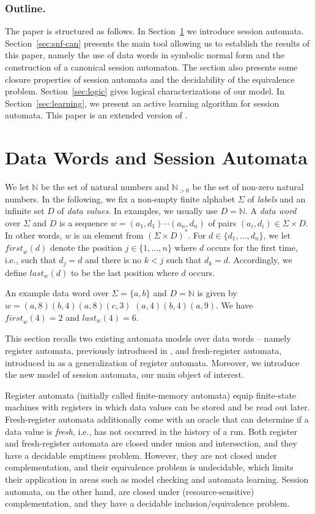 \documentclass{LMCS}
\def\N{\ensuremath{\mathbb N}\xspace}
\def\Nz{\ensuremath{\N_{{}>0}}\xspace}
\newcommand{\Data}{D}
\newcommand{\firstocc}[1]{\mathit{first}_{#1}}
\newcommand{\lastocc}[1]{\mathit{last}_{#1}}
\begin{document}
\subsubsection*{Outline.}
The paper is structured as follows. In Section~\ref{sec:data} we
introduce session automata. Section~\ref{sec:snf-can} presents the
main tool allowing us to establish the results of this paper, namely
the use of data words in symbolic normal form and the construction of
a canonical session automaton. The section also presents some closure
properties of session automata and the decidability of the equivalence
problem. Section~\ref{sec:logic} gives logical characterizations of
our model.  In Section~\ref{sec:learning}, we present an active
learning algorithm for session automata. This paper is an extended
version of \cite{BHLM-dlt2013}.


\section{Data Words and Session Automata}\label{sec:data}

We let $\N$ be the set of natural numbers and $\Nz$ be the set of
non-zero natural numbers. In the following, we fix a non-empty finite
alphabet $\Sigma$ of \emph{labels} and an infinite set $D$ of
\emph{data values}.  In examples, we usually use $D = \N$.  A
\emph{data word} over $\Sigma$ and $\Data$ is a sequence $w =
(a_1,d_1) \cdots (a_n,d_n)$ of pairs $(a_i,d_i) \in \Sigma\times
D$. In other words, $w$ is an element from $(\Sigma\times D)^{*}$. For
$d \in \{d_1,\ldots,d_n\}$, we let $\firstocc{w}(d)$ denote the
position $j \in \{1,\ldots,n\}$ where $d$ occurs for the first time,
i.e., such that $d_j = d$ and there is no $k <j$ such that $d_k =
d$. Accordingly, we define $\lastocc{w}(d)$ to be the last position
where $d$ occurs.

An example data word over $\Sigma = \{a,b\}$ and $D = \N$ is given by
$w=(a,8)(b,4)(a,8)(c,3)$ $(a,4)(b,4)(a,9)$. We have
$\firstocc{w}(4)=2$ and $\lastocc{w}(4)=6$.

This section recalls two existing automata models over data words --
namely register automata, previously introduced in
\cite{Kaminski1994}, and fresh-register automata, introduced in
\cite{DBLP:conf/popl/Tzevelekos11} as a generalization of register
automata. Moreover, we introduce the new model of session automata,
our main object of interest.

Register automata (initially called finite-memory automata) equip finite-state
machines with registers in which data values can be stored and be read
out later. Fresh-register automata additionally come with an oracle that
can determine if a data value is \emph{fresh}, i.e., has not occurred in the
history of a run. Both register and fresh-register automata
are closed under union and intersection, and they have a decidable emptiness
problem. However, they are not closed under complementation, and their
equivalence problem is undecidable, which limits their application in areas such
as model checking and automata learning.
Session automata, on the other hand, are closed under (resource-sensitive)
complementation, and they have a decidable inclusion/equivalence problem.
\end{document}
